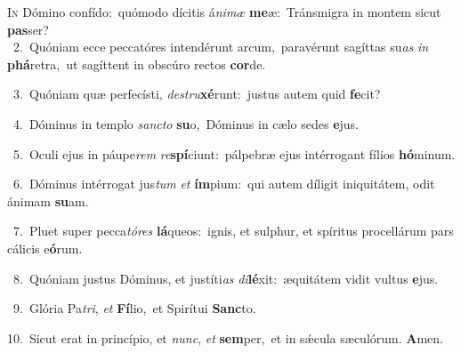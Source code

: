 \lettrine{\initial\textcolor{\initialcolor}{I}}{n} Dómino confído:~\dagger quómodo dícitis á\-\textit{ni}\-\textit{mæ} \textbf{me}\-æ:~\star Tránsmigra in montem sicut \textbf{pas}\-ser?\\
{\numbfont\textcolor{\numbcolor}{~2.}}~Quóniam ecce peccatóres intendérunt arcum,~\dagger paravérunt sagíttas su\textit{as} \textit{in} \textbf{phá}\-retra,~\star ut sagíttent in obscúro rectos \textbf{cor}\-de.\par
{\numbfont\textcolor{\numbcolor}{~3.}}~Quóniam quæ perfecísti, \textit{de}\-\textit{stru}\textbf{xé}runt:~\star justus autem quid \textbf{fe}\-cit?\par
{\numbfont\textcolor{\numbcolor}{~4.}}~Dóminus in templo \textit{sanc}\-\textit{to} \textbf{su}\-o,~\star Dóminus in cælo sedes \textbf{e}\-jus.\par
{\numbfont\textcolor{\numbcolor}{~5.}}~Oculi ejus in páupe\textit{rem} \textit{re}\-\textbf{spí}ciunt:~\star pálpebræ ejus intérrogant fílios \textbf{hó}\-minum.\par
{\numbfont\textcolor{\numbcolor}{~6.}}~Dóminus intérrogat jus\textit{tum} \textit{et} \textbf{ím}\-pium:~\star qui autem díligit iniquitátem, odit ánimam \textbf{su}\-am.\par
{\numbfont\textcolor{\numbcolor}{~7.}}~Pluet super pecca\-\textit{tó}\-\textit{res} \textbf{lá}\-queos:~\star ignis, et sulphur, et spíritus procellárum pars cálicis e\-\textbf{ó}\-rum.\par
{\numbfont\textcolor{\numbcolor}{~8.}}~Quóniam justus Dóminus, et justíti\textit{as} \textit{di}\-\textbf{lé}xit:~\star æquitátem vidit vultus \textbf{e}\-jus.\par
{\numbfont\textcolor{\numbcolor}{~9.}}~Glória Pa\-\textit{tri}\-, \textit{et} \textbf{Fí}\-lio,~\star et Spirítui \textbf{Sanc}\-to.\par
{\numbfont\textcolor{\numbcolor}{10.}}~Sicut erat in princípio, et \textit{nunc}\-, \textit{et} \textbf{sem}\-per,~\star et in sǽcula sæculórum. \textbf{A}\-men.\par
